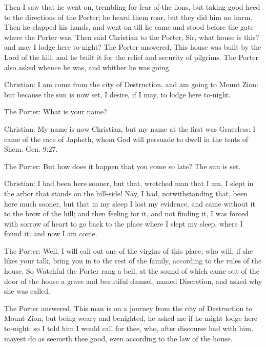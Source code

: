 Then I saw that he went on, trembling for fear of the lions, but taking good heed to the directions of the Porter; he heard them roar, but they did him no harm. Then he clapped his hands, and went on till he came and stood before the gate where the Porter was. Then said Christian to the Porter, Sir, what house is this? and may I lodge here to-night? The Porter answered, This house was built by the Lord of the hill, and he built it for the relief and security of pilgrims. The Porter also asked whence he was, and whither he was going.

Christian: I am come from the city of Destruction, and am going to Mount Zion: but because the sun is now set, I desire, if I may, to lodge here to-night.

The Porter: What is your name?

Christian: My name is now Christian, but my name at the first was Graceless: I came of the race of Japheth, whom God will persuade to dwell in the tents of Shem. Gen. 9:27.

The Porter: But how does it happen that you come so late? The sun is set.

Christian: I had been here sooner, but that, wretched man that I am, I slept in the arbor that stands on the hill-side! Nay, I had, notwithstanding that, been here much sooner, but that in my sleep I lost my evidence, and came without it to the brow of the hill; and then feeling for it, and not finding it, I was forced with sorrow of heart to go back to the place where I slept my sleep, where I found it; and now I am come.

The Porter: Well, I will call out one of the virgins of this place, who will, if she likes your talk, bring you in to the rest of the family, according to the rules of the house. So Watchful the Porter rang a bell, at the sound of which came out of the door of the house a grave and beautiful damsel, named Discretion, and asked why she was called.

The Porter answered, This man is on a journey from the city of Destruction to Mount Zion; but being weary and benighted, he asked me if he might lodge here to-night: so I told him I would call for thee, who, after discourse had with him, mayest do as seemeth thee good, even according to the law of the house.

